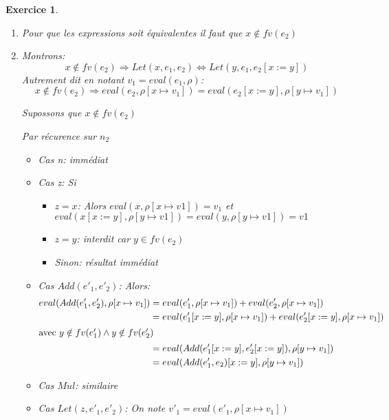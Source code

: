 \documentclass{article}
\theoremstyle{plain}
\newtheorem{exo}{Exercice}%
\begin{document}
\begin{exo}
\begin{enumerate}
\begin{enumerate}
        Si on subsitue $x$ par $y$  on aurra $Let(y, Add(1, 2), Add(y, y)) \rightarrow 6$

    \item Pour que les expressions soit équivalentes il faut que $x \notin fv(e_2)$

    \item Montrons: 
        \begin{equation*}            
x \notin fv(e_2) \Rightarrow Let(x, e_1, e_2) \Leftrightarrow Let(y, e_1, e_2[x:=y])
        \end{equation*} 
        Autrement dit en notant $v_1 = eval(e_1, \rho)$:
        \begin{equation*}            
x \notin fv(e_2) \Rightarrow eval(e_2, \rho[x \mapsto  v_1]) = eval(e_2[x:=y], \rho[y \mapsto  v_1])
        \end{equation*} 
        
        Supossons que $x\notin fv(e_2)$

        Par récurence sur $n_2$
        \begin{itemize}
        \item Cas n: immédiat
        \item Cas z: Si 
            \begin{itemize}
            \item $z = x$: Alors $eval(x,\rho[x \mapsto  v1]) = v_1$ et 
            $eval(x[x := y],\rho[y \mapsto  v1]) = eval(y,\rho[y \mapsto  v1]) = v1$
            \item $z = y$: interdit car $y \in fv(e_2)$
            \item Sinon: résultat immédiat
            \end{itemize} 
        \item Cas $Add(e'_1, e'_2)$: Alors:
            \begin{align*}
                eval(Add(e'_1, e'_2), \rho[x \mapsto  v_1]) &= eval(e'_1, \rho[x \mapsto  v_1]) + eval(e'_2, \rho[x \mapsto  v_1]) \\
                                                    &=  eval(e'_1[x := y], \rho[x \mapsto  v_1]) + eval(e'_2[x := y], \rho[x \mapsto  v_1]) \\
                                                    \intertext{avec $y \notin fv(e'_1) \wedge y \notin fv(e'_2)$}
                                                    &= eval(Add(e'_1[x:=y], e'_2[x:=y]), \rho[y \mapsto  v_1]) \\
                                                    &= eval(Add(e'_1, e_2)[x:=y], \rho[y \mapsto  v_1])
            \end{align*}
        \item Cas $Mul$: similaire
        \item Cas $Let(z, e'_1, e'_2)$: On note $v'_1 = eval(e'_1, \rho[x \mapsto  v_1])$
        

\end{itemize}
\end{enumerate}
\end{enumerate}
\end{exo}
\end{document}
